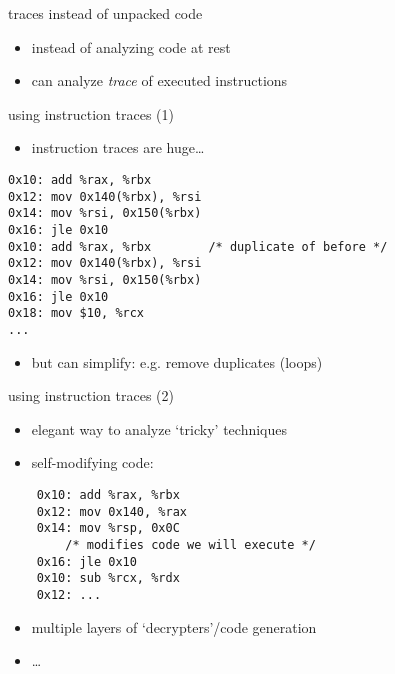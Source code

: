 \begin{frame}{traces instead of unpacked code}
    \begin{itemize}
    \item instead of analyzing code at rest
    \item can analyze \textit{trace} of executed instructions
    \end{itemize}
\end{frame}

\begin{frame}[fragile,label=instrTraces1]{using instruction traces (1)}
\begin{itemize}
\item instruction traces are huge\ldots
\end{itemize}
\begin{lstlisting}
0x10: add %rax, %rbx
0x12: mov 0x140(%rbx), %rsi
0x14: mov %rsi, 0x150(%rbx)
0x16: jle 0x10
0x10: add %rax, %rbx        /* duplicate of before */
0x12: mov 0x140(%rbx), %rsi
0x14: mov %rsi, 0x150(%rbx)
0x16: jle 0x10
0x18: mov $10, %rcx
...
\end{lstlisting}
\begin{itemize}
\item but can simplify: e.g. remove duplicates (loops)
\end{itemize}
\end{frame}

\begin{frame}[fragile,label=instrTraces2]{using instruction traces (2)}
\begin{itemize}
\item elegant way to analyze `tricky' techniques
\item self-modifying code:
\end{itemize}
\begin{lstlisting}
    0x10: add %rax, %rbx
    0x12: mov 0x140, %rax
    0x14: mov %rsp, 0x0C
        /* modifies code we will execute */
    0x16: jle 0x10
    0x10: sub %rcx, %rdx
    0x12: ...
\end{lstlisting}
\begin{itemize}
\item multiple layers of `decrypters'/code generation
\item \ldots
\end{itemize}
\end{frame}

